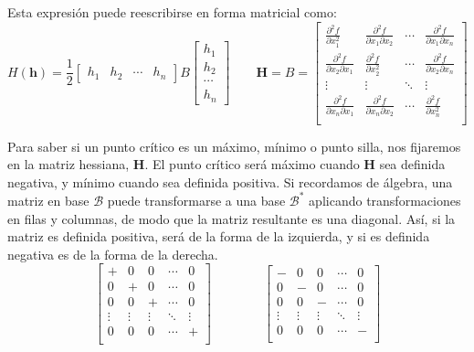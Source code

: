 \documentclass[a4paper]{article}
\begin{document}
Esta expresión puede reescribirse en forma matricial como:
\[ H(\textbf{h}) = \frac{1}{2} \left[\begin{matrix}
h_1&h_2&\cdots &h_n
\end{matrix}\right] 
B
\left[\begin{matrix}
h_1\\h_2\\\cdots\\ h_n
\end{matrix}\right] \qquad \textbf{H} = B = \left[\begin{matrix}
\frac{\partial^2 f}{\partial x_1^2} & \frac{\partial^2 f}{\partial x_1 \partial x_2} &\cdots& \frac{\partial^2 f}{\partial x_1 \partial x_n} \\
\frac{\partial^2 f}{\partial x_2\partial x_1} & \frac{\partial^2 f}{ \partial x_2^2} &\cdots& \frac{\partial^2 f}{\partial x_2 \partial x_n} \\
\vdots & \vdots &\ddots& \vdots \\
\frac{\partial^2 f}{\partial x_n \partial x_1} & \frac{\partial^2 f}{\partial x_n \partial x_2} &\cdots& \frac{\partial^2 f}{ \partial x_n^2} \\
\end{matrix}\right] \]

Para saber si un punto crítico es un máximo, mínimo o punto silla, nos fijaremos en la matriz hessiana, \textbf{H}. El punto crítico será máximo cuando $\textbf{H}$ sea definida negativa, y mínimo cuando sea definida positiva. Si recordamos de álgebra, una matriz en base $\mathcal{B}$ puede transformarse a una base $\mathcal{B}^*$ aplicando transformaciones en filas y columnas, de modo que la matriz resultante es una diagonal. Así, si la matriz es definida positiva, será de la forma de la izquierda, y si es definida negativa es de la forma de la derecha.
\[\left[\begin{matrix}
+ & 0 & 0 & \cdots & 0\\
0 & + & 0 & \cdots & 0\\
0 & 0 & + & \cdots & 0\\
\vdots & \vdots & \vdots & \ddots & \vdots\\
0 & 0 & 0 & \cdots & +\\

\end{matrix}\right] \qquad\qquad
\left[\begin{matrix}
- & 0 & 0 & \cdots & 0\\
0 & - & 0 & \cdots & 0\\
0 & 0 & - & \cdots & 0\\
\vdots & \vdots & \vdots & \ddots & \vdots\\
0 & 0 & 0 & \cdots & -\\
\end{matrix}\right]
\]
\end{document}
